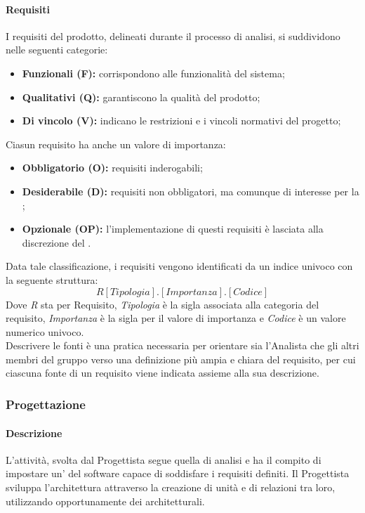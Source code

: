 \paragraph{Requisiti}
I requisiti del prodotto, delineati durante il processo di analisi, si suddividono nelle seguenti categorie:
\begin{itemize}
  \item \textbf{Funzionali (F):} corrispondono alle funzionalità del sistema;
  \item \textbf{Qualitativi (Q):} garantiscono la qualità del prodotto;
  \item \textbf{Di vincolo (V):} indicano le restrizioni e i vincoli normativi del progetto;
\end{itemize}
Ciasun requisito ha anche un valore di importanza:
\begin{itemize}
  \item \textbf{Obbligatorio (O):} requisiti inderogabili;
  \item \textbf{Desiderabile (D):} requisiti non obbligatori, ma comunque di interesse per la ;
  \item \textbf{Opzionale (OP):} l'implementazione di questi requisiti è lasciata alla discrezione del .
\end{itemize}
Data tale classificazione, i requisiti vengono identificati da un indice univoco con la seguente struttura:
\[R[Tipologia].[Importanza].[Codice]\]
Dove \emph{R} sta per Requisito, \emph{Tipologia} è la sigla associata alla categoria del requisito, \emph{Importanza} è la sigla per il valore di importanza e \emph{Codice} è un valore numerico univoco.\\
Descrivere le fonti è una pratica necessaria per orientare sia l'Analista che gli altri membri del gruppo verso una definizione più ampia e chiara del requisito, per cui ciascuna fonte di un requisito viene indicata assieme alla sua descrizione.


\subsubsection{Progettazione}\label{progettazione}
\paragraph{Descrizione}
L'attività, svolta dal Progettista segue quella di analisi e ha il compito di impostare un' del software capace di soddisfare i requisiti definiti. Il Progettista sviluppa l'architettura attraverso la creazione di unità e di relazioni tra loro, utilizzando opportunamente dei  architetturali.\\

